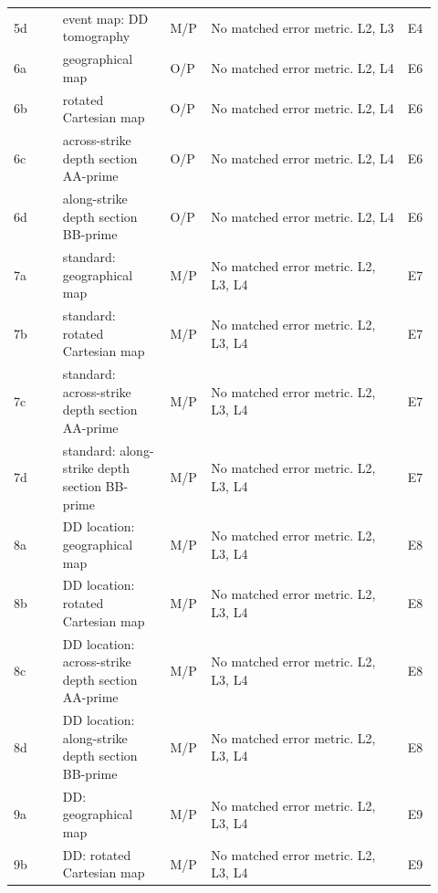 \begin{longtable}{@{}p{0.115\linewidth}p{0.245\linewidth}p{0.06\linewidth}p{0.445\linewidth}p{0.055\linewidth}@{}}
5d & event map: DD tomography & M/P & No matched error metric. L2, L3 & E4\\[3pt]

6a & geographical map & O/P & No matched error metric. L2, L4 & E6\\[3pt]

6b & rotated Cartesian map & O/P & No matched error metric. L2, L4 & E6\\[3pt]

6c & across-strike depth section AA-prime & O/P & No matched error metric. L2, L4 & E6\\[3pt]

6d & along-strike depth section BB-prime & O/P & No matched error metric. L2, L4 & E6\\[3pt]

7a & standard: geographical map & M/P & No matched error metric. L2, L3, L4 & E7\\[3pt]

7b & standard: rotated Cartesian map & M/P & No matched error metric. L2, L3, L4 & E7\\[3pt]

7c & standard: across-strike depth section AA-prime & M/P & No matched error metric. L2, L3, L4 & E7\\[3pt]

7d & standard: along-strike depth section BB-prime & M/P & No matched error metric. L2, L3, L4 & E7\\[3pt]

8a & DD location: geographical map & M/P & No matched error metric. L2, L3, L4 & E8\\[3pt]

8b & DD location: rotated Cartesian map & M/P & No matched error metric. L2, L3, L4 & E8\\[3pt]

8c & DD location: across-strike depth section AA-prime & M/P & No matched error metric. L2, L3, L4 & E8\\[3pt]

8d & DD location: along-strike depth section BB-prime & M/P & No matched error metric. L2, L3, L4 & E8\\[3pt]

9a & DD: geographical map & M/P & No matched error metric. L2, L3, L4 & E9\\[3pt]

9b & DD: rotated Cartesian map & M/P & No matched error metric. L2, L3, L4 & E9\\[3pt]


\end{longtable}
